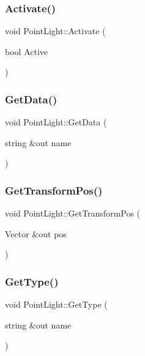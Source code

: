 \subsubsection{\texorpdfstring{Activate()}{Activate()}}
{\footnotesize\ttfamily void Point\+Light\+::\+Activate (\begin{DoxyParamCaption}\item[{bool}]{Active }\end{DoxyParamCaption})}

\hypertarget{class_point_light_a045fdfe1cb6a88e2416bd0315d062ff1}{}\label{class_point_light_a045fdfe1cb6a88e2416bd0315d062ff1} 
\subsubsection{\texorpdfstring{Get\+Data()}{GetData()}}
{\footnotesize\ttfamily void Point\+Light\+::\+Get\+Data (\begin{DoxyParamCaption}\item[{string \&out}]{name }\end{DoxyParamCaption})}

\hypertarget{class_point_light_aef2cc3061c95443d01c7ea67f97daceb}{}\label{class_point_light_aef2cc3061c95443d01c7ea67f97daceb} 
\subsubsection{\texorpdfstring{Get\+Transform\+Pos()}{GetTransformPos()}}
{\footnotesize\ttfamily void Point\+Light\+::\+Get\+Transform\+Pos (\begin{DoxyParamCaption}\item[{Vector \&out}]{pos }\end{DoxyParamCaption})}

\hypertarget{class_point_light_a55bf006faad868b8e25c8b10f94a7d6d}{}\label{class_point_light_a55bf006faad868b8e25c8b10f94a7d6d} 
\subsubsection{\texorpdfstring{Get\+Type()}{GetType()}}
{\footnotesize\ttfamily void Point\+Light\+::\+Get\+Type (\begin{DoxyParamCaption}\item[{string \&out}]{name }\end{DoxyParamCaption})}

